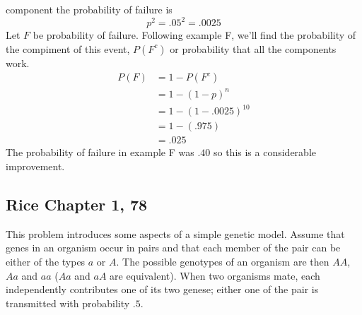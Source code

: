 \documentclass{tufte-book}
\theoremstyle{mytheoremstyle}
\theoremstyle{mylemstyle}
\theoremstyle{mydefstyle}
\begin{document}
 component the probability of failure is
\[ p^2=.05^2=.0025 \]
Let $F$ be probability of failure. Following example F, we'll find the probability of the compiment of this event, $P(F^c)$ or probability that all the components work.
\begin{align}
P(F) &= 1 - P(F^c) \\
&= 1 - (1-p)^n \\
&= 1 - (1-.0025)^{10} \\
&= 1 - (.975) \\
&= .025
\end{align}
The probability of failure in example F was $.40$ so this is a considerable improvement.


\subsection{Rice Chapter 1, 78}
This problem introduces some aspects of a simple genetic model.  Assume that genes in an organism occur in pairs and that each member of the pair can be either of the types $a$ or $A$.  The possible genotypes of an organism are then $AA$, $Aa$ and $aa$ ($Aa$ and $aA$ are equivalent).  When two organisms mate, each independently contributes one of its two genese; either one of the pair is transmitted with probability $.5$.
\end{document}
